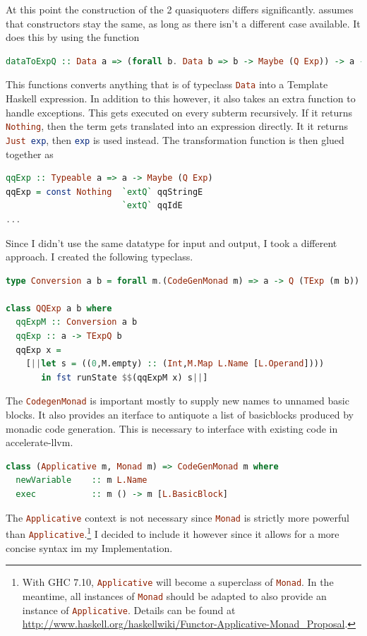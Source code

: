 \documentclass[a4paper,bibliography=totocnumbered,parskip,headsepline]{scrbook}
\begin{document}
At this point the construction of the 2 quasiquoters differs significantly.
 assumes that constructors stay the same, as long as there isn't a different case available.
It does this by using the function
\begin{lstlisting}[language=haskell]
dataToExpQ :: Data a => (forall b. Data b => b -> Maybe (Q Exp)) -> a -> Q Exp
\end{lstlisting}
This functions converts anything that is of typeclass \lstinline[language=haskell]!Data! into a Template Haskell expression.
In addition to this however, it also takes an extra function to handle exceptions.
This gets executed on every subterm recursively.
If it returns \lstinline[language=haskell]!Nothing!, then the term gets translated into an expression directly.
It it returns \lstinline[language=haskell]!Just exp!, then \lstinline[language=haskell]!exp! is used instead.
The transformation function is then glued together as
\begin{lstlisting}[language=haskell]
qqExp :: Typeable a => a -> Maybe (Q Exp)
qqExp = const Nothing  `extQ` qqStringE
                       `extQ` qqIdE
...
\end{lstlisting}
Since I didn't use the same datatype for input and output, I took a different approach.
I created the following typeclass.
\begin{lstlisting}[language=haskell]
type Conversion a b = forall m.(CodeGenMonad m) => a -> Q (TExp (m b))

class QQExp a b where
  qqExpM :: Conversion a b
  qqExp :: a -> TExpQ b
  qqExp x =
    [||let s = ((0,M.empty) :: (Int,M.Map L.Name [L.Operand])))
       in fst runState $$(qqExpM x) s||]
\end{lstlisting}
The \lstinline[language=haskell]!CodegenMonad! is important mostly to supply new names to unnamed basic blocks.
It also provides an iterface to antiquote a list of basicblocks produced by monadic code generation.
This is necessary to interface with existing code in accelerate-llvm.
\begin{lstlisting}[language=haskell]
class (Applicative m, Monad m) => CodeGenMonad m where
  newVariable    :: m L.Name
  exec           :: m () -> m [L.BasicBlock]
\end{lstlisting}
The \lstinline[language=haskell]!Applicative! context is not necessary since \lstinline[language=haskell]!Monad! is strictly more powerful than \lstinline[language=haskell]!Applicative!.\footnote{With GHC 7.10, \lstinline[language=haskell]!Applicative! will become a superclass of \lstinline[language=haskell]!Monad!.
In the meantime, all instances of \lstinline[language=haskell]!Monad! should be adapted to also provide an instance of \lstinline[language=haskell]!Applicative!.
Details can be found at \url{http://www.haskell.org/haskellwiki/Functor-Applicative-Monad_Proposal}.}
I decided to include it however since it allows for a more concise syntax im my Implementation.
\end{document}
